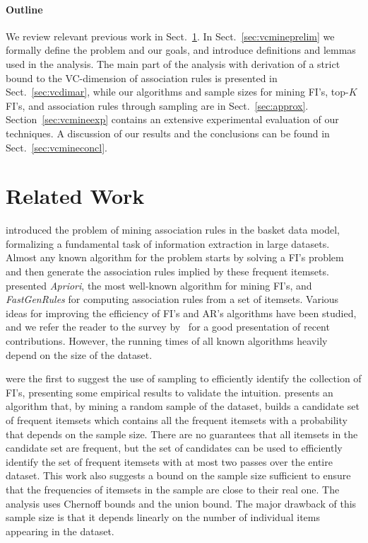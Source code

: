 \paragraph{Outline}
We review relevant previous work in Sect.~\ref{sec:vcmineprevwork}. In
Sect.~\ref{sec:vcmineprelim} we formally define the problem
and our goals, and introduce definitions and lemmas used in the analysis. The
main part of the analysis with derivation of a strict bound to the VC-dimension
of association rules is presented in Sect.~\ref{sec:vcdimar}, while our
algorithms and sample sizes for mining FI's, top-$K$ FI's, and association rules
through sampling are in Sect.~\ref{sec:approx}. Section~\ref{sec:vcmineexp} contains
an extensive experimental evaluation of our techniques. A discussion of our
results and the conclusions can be found in Sect.~\ref{sec:vcmineconcl}.

\section{Related Work}\label{sec:vcmineprevwork}
\citet{AgrawalIS93} introduced the problem of mining association
rules in the basket data model, formalizing a fundamental task of information
extraction in large datasets. Almost any known algorithm for the problem starts
by solving a FI's problem and then generate the association rules implied by
these frequent itemsets. \citet{AgrawalS94} presented
\emph{Apriori}, the most well-known algorithm for mining FI's, and
\emph{FastGenRules} for computing association rules from a set of itemsets.
Various ideas for improving the efficiency of FI's and AR's algorithms have been
studied, and we refer the reader to the survey by~\citet{CeglarR06} for a good presentation of recent contributions.
However, the running times of all known algorithms heavily depend on the size of
the dataset.  

\citet{MannilaTV94} were the first to suggest the 
use of sampling to efficiently identify the collection of FI's, presenting some empirical
results to validate the intuition. \citet{Toivonen96} presents an
algorithm that, by mining a random sample of the dataset, builds a candidate set
of frequent itemsets which contains all the frequent itemsets with a probability
that depends on the sample size. There are no guarantees that all itemsets
in the candidate set are frequent, but the set of candidates can be used to
efficiently identify the set of frequent itemsets with at most two passes over
the entire dataset. This work also suggests a bound on the sample size sufficient
to ensure that the frequencies of itemsets in the sample are close to their real
one. The analysis uses Chernoff bounds and the union bound. The major drawback
of this sample size is that it depends linearly on the number of individual
items appearing in the dataset.


